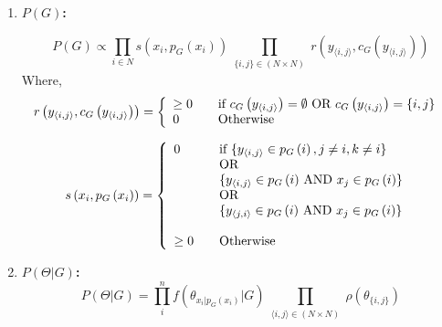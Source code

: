 \documentclass[]{article}
\begin{document}
\begin{enumerate}
 
\item \textbf{$P(G) $:}

\begin{equation}\label{eq:equation5}
P\left(G \right) \propto \prod_{i \in N }  
														s\left(x_i, p_G\left( x_i \right)\right)   
												\prod_{\substack{ 
															\lbrace i,j \rbrace \in \left(N \times N\right)  } }   
												 		r\left( y_{\langle i,j\rangle} , c_G\left( y_{\langle i,j\rangle}  \right)\right)
\end{equation}
Where,
\begin{equation}\label{eq:equation6}
	r\left( y_{\langle i,j\rangle}  , c_G\left(y_{\langle i,j\rangle}  \right)\right) = \left\{ 
  					\begin{array}{l l}
    					 	\geq 0  & \quad \text{if $c_G\left( y_{\langle i,j\rangle}  \right) = \emptyset$  OR  $c_G\left( y_{\langle i,j\rangle}  \right) = \lbrace i, j\rbrace $ }\\
    						0 & \quad \text{Otherwise}
  					\end{array} \right.			   
\end{equation}		

\begin{equation}\label{eq:equation7}
	 				s\left(x_i, p_G\left( x_i \right)\right)  = \left\{ 
  					\begin{array}{l l}
    						0  & \quad \text{if $ \lbrace y_{\langle i, j \rangle } \in p_G \left( i \right), j \neq i, k \neq i \rbrace $ }\\
    							& \quad \text  {OR}\\
    							& \quad \text{$ \lbrace y_{\langle i, j \rangle } \in p_G\left( i \right)$ AND  $ x_j \in p_G \left( i \right) \rbrace $ }\\ 
    							& \quad \text{OR}\\
    							& \quad \text{$ \lbrace y_{\langle j, i \rangle } \in p_G\left( i \right)$ AND  $ x_j \in p_G \left( i \right) \rbrace $}\\\\
    					    \geq 0 & \quad \text{Otherwise}
  					\end{array} \right.	
\end{equation}	


\item \textbf{$P(\Theta | G) $:}
\begin{equation}\label{eq:equation8}
P(\Theta | G) = \prod_i^{n} f( \theta_{x_i | p_G \left( x_i \right) } | G ) \prod_{\substack{ 
															\langle i,j\rangle \in \left(N \times N\right)}}
															\rho \left( \theta_{\lbrace i, j \rbrace} \right)
\end{equation}


\end{enumerate}
\end{document}
